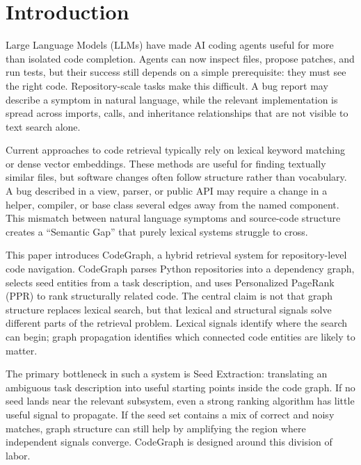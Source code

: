 \section{Introduction}
\label{sec:introduction}

Large Language Models (LLMs) have made AI coding agents useful for more than isolated code completion. Agents can now inspect files, propose patches, and run tests, but their success still depends on a simple prerequisite: they must see the right code. Repository-scale tasks make this difficult. A bug report may describe a symptom in natural language, while the relevant implementation is spread across imports, calls, and inheritance relationships that are not visible to text search alone. 

Current approaches to code retrieval typically rely on lexical keyword matching or dense vector embeddings. These methods are useful for finding textually similar files, but software changes often follow structure rather than vocabulary. A bug described in a view, parser, or public API may require a change in a helper, compiler, or base class several edges away from the named component. This mismatch between natural language symptoms and source-code structure creates a ``Semantic Gap'' that purely lexical systems struggle to cross.

This paper introduces CodeGraph, a hybrid retrieval system for repository-level code navigation. CodeGraph parses Python repositories into a dependency graph, selects seed entities from a task description, and uses Personalized PageRank (PPR) to rank structurally related code. The central claim is not that graph structure replaces lexical search, but that lexical and structural signals solve different parts of the retrieval problem. Lexical signals identify where the search can begin; graph propagation identifies which connected code entities are likely to matter.

The primary bottleneck in such a system is Seed Extraction: translating an ambiguous task description into useful starting points inside the code graph. If no seed lands near the relevant subsystem, even a strong ranking algorithm has little useful signal to propagate. If the seed set contains a mix of correct and noisy matches, graph structure can still help by amplifying the region where independent signals converge. CodeGraph is designed around this division of labor.

